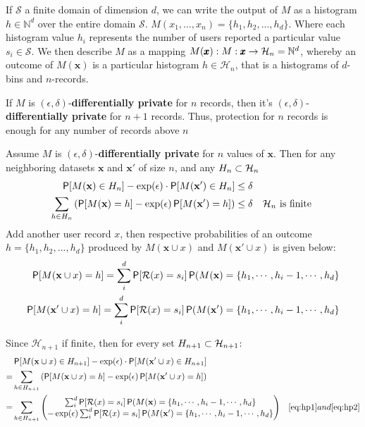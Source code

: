 \documentclass[11pt]{article}
\newcommand{\bbx}{\pmb{x}}
\newcommand{\cR}{\mathcal{R}}
\newcommand{\N}{\mathbb{N}}
\newcommand{\Ssp}{\mathcal{S}}
\newcommand{\Hsp}{\mathcal{H}}
\newcommand{\xv}{\mathbf{x}}
\begin{document}
If $\Ssp$ a finite domain of dimension $d$,  we can write the output of $M$ as a histogram $h \in \N^d$ over the entire domain $\Ssp$.   $M(x_1,  \dots , x_n) = \{h_1, h_2, ..., h_d\}$. Where each histogram value $h_i$ represents the number of users reported a particular value $s_i \in  \Ssp$.   We then describe $M$ as a mapping $M(\bbx):\map{M}{\bbx}{\Hsp_n = \N^d}$, whereby an outcome of $M(\bbx)$ is a particular histogram $h \in \Hsp_n$, that is a histograms of $d$-bins and $n$-records.

\begin{prop} If $M$ is $(\epsilon,\delta)$-\textbf{differentially private} for $n$ records, then it's $(\epsilon,\delta)$-\textbf{differentially private} for $n+1$ records. Thus, protection for $n$ records is enough for any number of records above $n$

Assume  $M$ is  $(\epsilon,\delta)$-\textbf{differentially private} for $n$ values of $\bbx$. Then for any neighboring datasets $\bbx$ and $\bbx'$ of size $n$, and any $H_n \cont \Hsp_n$
 \begin{align}
 \P[M(\xv) \in H_n] - \exp(\epsilon) \cdot \P[M(\xv') \in H_n]  \le \delta &  & \\
 \sum_{h \in H_n} \left ( \P[M(\xv) = h] -  \exp(\epsilon)  \P[M(\xv') = h]  \right )  \le \delta  &  & \Hsp_n \text{ is finite }  \label{eq:histdiff}
\end{align}
Add another user record $x$, then respective probabilities of an outcome $h=\{h_1, h_2, ..., h_d\}$ produced by $M(\xv \cup x)$ and $M(\xv' \cup x)$ is given below:
 \begin{align}
\P[M(\xv \cup x) = h] = \sum^d_i \P[\cR(x) = s_i]\P(M(\xv) = \{h_1 , \cdots ,h_i -1, \cdots, h_d \} \label{eq:hp1} \\
\P[M(\xv' \cup x) = h] = \sum^d_i \P[\cR(x) = s_i]\P(M(\xv') = \{h_1 , \cdots ,h_i -1, \cdots, h_d \} \label{eq:hp2}
\end{align}

Since $ \Hsp_{n+1}$ if finite, then for every set $H_{n+1} \cont  \Hsp_{n+1}$:
 \begin{align*}
 & \P[M(\xv \cup x) \in H_{n+1}] - \exp(\epsilon) \cdot \P[M(\xv' \cup x) \in H_{n+1}]  & \\
 = & \sum_{h \in H_{n+1}} \left ( \P[M(\xv \cup x) = h] -  \exp(\epsilon)  \P[M(\xv' \cup x) = h]  \right )  & \\
 =  & \sum_{h \in H_{n+1}}   \left (    \begin{matrix}
\sum^d_i \P[\cR(x) = s_i]\P(M(\xv) = \{h_1 , \cdots ,h_i -1, \cdots, h_d \}  \\ 
 -  \exp(\epsilon)\sum^d_i \P[\cR(x) = s_i]\P(M(\xv') = \{h_1 , \cdots ,h_i -1, \cdots, h_d \}   
\end{matrix}
  \right) &  \eqref{eq:hp1}  and  \eqref{eq:hp2} 
\end{align*}


\end{prop}
\end{document}
